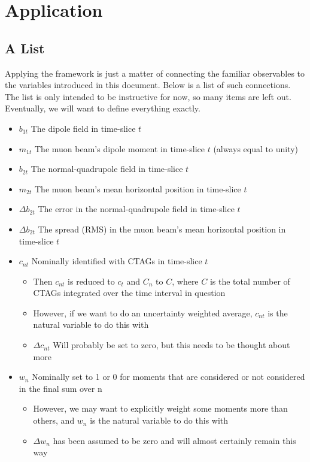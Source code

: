 \documentclass[twoside]{article}
\begin{document}
\newpage
\section{Application}
\subsection{A List}
Applying the framework is just a matter of connecting the familiar observables to the variables introduced in this document. Below is a list of such connections. The list is only intended to be instructive for now, so many items are left out. Eventually, we will want to define everything exactly.
\begin{itemize}
	\item $b_{1t}$  The dipole field in time-slice $t$
	\item $m_{1t}$ The muon beam's dipole moment in time-slice $t$ (always equal to unity)
	\item $b_{2t}$ The normal-quadrupole  field in time-slice $t$
	\item $m_{2t}$ The muon beam's mean horizontal position in time-slice $t$
	 \item $\Delta b_{2t}$ The error in the normal-quadrupole  field in time-slice $t$
	 \item $\Delta b_{2t}$ The spread (RMS) in the muon beam's mean horizontal position in time-slice $t$	
	 \item $c_{nt}$ Nominally identified with CTAGs in time-slice $t$
	 \begin{itemize}
	 	 \item Then $c_{nt}$  is reduced to $c_{t}$ and $C_{n}$ to $C$, where $C$ is the total number of CTAGs integrated over the time interval in question 
	 	 \item However, if we want to do an uncertainty weighted average, $c_{nt}$ is the natural variable to do this with
	 	 \item  $\Delta c_{nt}$ Will probably be set to zero, but this needs to be thought about more
	 \end{itemize}
	 \item  $w_{n}$ Nominally set to 1 or 0 for moments that are considered or not considered in the final sum over n
	 \begin{itemize}
	 	 \item However, we may want to explicitly weight some moments more than others, and $w_{n}$ is the natural variable to do this with
	 	 \item  $\Delta w_{n}$ has been assumed to be zero and will almost certainly remain this way
	 \end{itemize}
	
\end{itemize}
\end{document}
